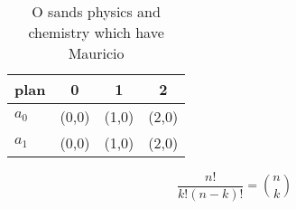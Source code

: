 \documentclass[a4paper]{article}
\begin{document}
\begin{table}
\begin{adjustbox}{width=0.6\columnwidth}
\begin{tabular}{|l|l|l|l|}
\hline
\textbf{plan} & \multicolumn{1}{c|}{\textbf{0}} & \multicolumn{1}{c|}{\textbf{1}} & \multicolumn{1}{c|}{\textbf{2}} \\ \hline
\textbf{$a_0$}  & (0,0) & (1,0) & (2,0) \\ \hline
\textbf{$a_1$}  & (0,0) & (1,0) & (2,0) \\ \hline
\end{tabular}
\end{adjustbox}
\caption{O sands physics and chemistry which have Mauricio
}
\end{table}

\[ \frac{n!}{k!(n-k)!} = \binom{n}{k} \]
\end{document}
